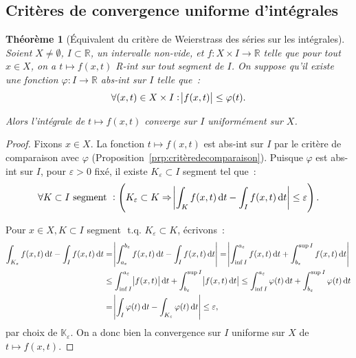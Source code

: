 \documentclass{report}
\newtheorem{thm}{Théorème}[chapter]
\theoremstyle{definition}
\theoremstyle{remark}
\newcommand{\K}{\mathbb K}
\newcommand{\R}{\mathbb R}
\newcommand{\tq}{\text{ t.q. }}
\begin{document}
		\subsection{Critères de convergence uniforme d'intégrales}
			\begin{thm}[Équivalent du critère de Weierstrass des séries sur les intégrales] Soient $X \neq \emptyset$, $I \subset \R$, un intervalle non-vide,
			et $f : X \times I \to \R$ telle que pour tout $x \in X$, on a $t \mapsto f(x, t)$ R-int sur tout segment de $I$. On suppose qu'il existe une
			fonction $\varphi : I \to \R$ abs-int sur $I$ telle que~:
			\[\forall (x, t) \in X \times I : \abs {f(x, t)} \leq \varphi(t).\]

			Alors l'intégrale de $t \mapsto f(x, t)$ converge sur $I$ uniformément sur $X$.
			\end{thm}

			\begin{proof} Fixons $x \in X$. La fonction $t \mapsto f(x, t)$ est abs-int sur $I$ par le critère de comparaison avec $\varphi$
			(Proposition~\ref{prp:critèredecomparaison}). Puisque $\varphi$ est abs-int sur $I$, pour $\varepsilon > 0$ fixé, il existe $K_\varepsilon \subset I$
			segment tel que~:
			\[\forall K \subset I \text{ segment } : \left(K_\varepsilon \subset K \Rightarrow \abs {\int_K f(x, t)\dif t - \int_I f(x, t)\dif t}
				\leq \varepsilon\right).\]

			Pour $x \in X, K \subset I$ segment $\tq K_\varepsilon \subset K$, écrivons~:
			\begin{align*}
				\int_{K_\varepsilon} f(x, t)\dif t - \int_I f(x, t)\dif t &= \abs {\int_{a_\varepsilon}^{b_\varepsilon} f(x, t)\dif t - \int_I f(x, t)\dif t}
					= \abs {\int_{\inf I}^{a_\varepsilon}f(x, t)\dif t + \int_{b_\varepsilon}^{\sup I}f(x, t)\dif t} \\
				&\leq \int_{\inf I}^{a_\varepsilon}\abs {f(x, t)}\dif t + \int_{b_\varepsilon}^{\sup I}\abs {f(x, t)\dif t}
					\leq \int_{\inf I}^{a_\varepsilon}\varphi(t)\dif t + \int_{b_\varepsilon}^{\sup I}\varphi(t)\dif t \\
				&= \abs {\int_I\varphi(t)\dif t - \int_{K_\varepsilon}\varphi(t)\dif t} \leq \varepsilon,
			\end{align*}
			par choix de $\K_\varepsilon$. On a donc bien la convergence sur $I$ uniforme sur $X$ de $t \mapsto f(x, t)$.
			\end{proof}
\end{document}
